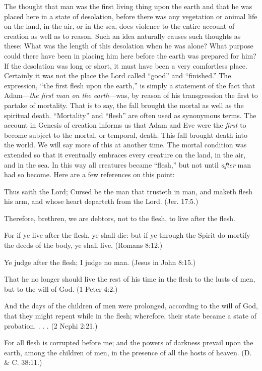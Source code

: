 The thought that man was the first living thing upon the earth and that he was placed here in
a state of desolation, before there was any vegetation or animal life on the land, in the air, or
in the sea, does violence to the entire account of creation as well as to reason. Such an idea
naturally causes such thoughts as these: What was the length of this desolation when he was
alone? What purpose could there have been in placing him here before the earth was
prepared for him? If the desolation was long or short, it must have been a very comfortless
place. Certainly it was not the place the Lord called ``good'' and ``finished.'' The expression,
``the first flesh upon the earth,'' is simply a statement of the fact that Adam—\textit{the first man on
the earth}—was, by reason of his transgression the first to partake of mortality. That is to say,
the fall brought the mortal as well as the spiritual death. ``Mortality'' and ``flesh'' are often
used as synonymous terms. The account in Genesis of creation informs us that Adam and
Eve were the \textit{first} to become subject to the mortal, or temporal, death. This fall brought death
into the world. We will say more of this at another time. The mortal condition was extended
so that it eventually embraces every creature on the land, in the air, and in the sea. In this way
all creatures became ``flesh,'' but not until \textit{after} man had so become. Here are a few
references on this point:

Thus saith the Lord; Cursed be the man that trusteth in man, and maketh flesh his arm, and
whose heart departeth from the Lord. (Jer. 17:5.)

Therefore, brethren, we are debtors, not to the flesh, to live after the flesh.

For if ye live after the flesh, ye shall die: but if ye through the Spirit do mortify the deeds of
the body, ye shall live. (Romans 8:12.)

Ye judge after the flesh; I judge no man. (Jesus in John 8:15.)

That he no longer should live the rest of his time in the flesh to the lusts of men, but to the
will of God. (1 Peter 4:2.)

And the days of the children of men were prolonged, according to the will of God, that they
might repent while in the flesh; wherefore, their state became a state of probation. . . . (2
Nephi 2:21.)

For all flesh is corrupted before me; and the powers of darkness prevail upon the earth,
among the children of men, in the presence of all the hosts of heaven. (D. \& C. 38:11.)

